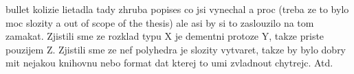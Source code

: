 bullet kolizie lietadla
tady zhruba popises co jsi vynechal a proc (treba ze to bylo moc slozity a out of scope of the thesis) ale asi by si to zaslouzilo na tom zamakat. Zjistili sme ze rozklad typu X je dementni protoze Y, takze priste pouzijem Z. Zjistili sme ze nef polyhedra je slozity vytvaret, takze by bylo dobry mit nejakou knihovnu nebo format dat kterej to umi zvladnout chytrejc. Atd.
